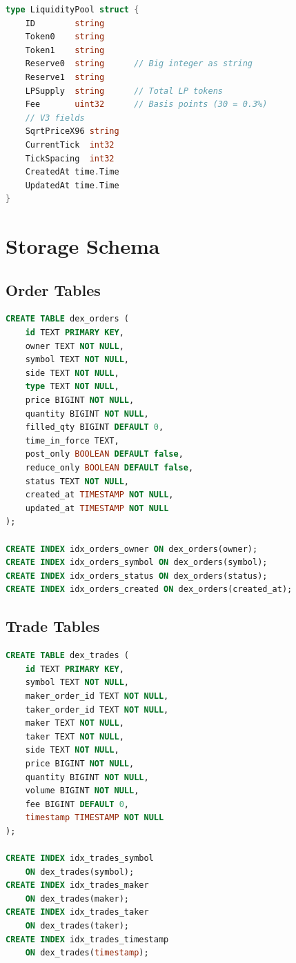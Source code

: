 \documentclass[11pt,twocolumn]{article}
\begin{document}
\begin{lstlisting}[language=Go,caption={Liquidity pool representation}]
type LiquidityPool struct {
    ID        string
    Token0    string
    Token1    string
    Reserve0  string      // Big integer as string
    Reserve1  string
    LPSupply  string      // Total LP tokens
    Fee       uint32      // Basis points (30 = 0.3%)
    // V3 fields
    SqrtPriceX96 string
    CurrentTick  int32
    TickSpacing  int32
    CreatedAt time.Time
    UpdatedAt time.Time
}
\end{lstlisting}

\section{Storage Schema}

\subsection{Order Tables}

\begin{lstlisting}[language=SQL,caption={Order storage schema}]
CREATE TABLE dex_orders (
    id TEXT PRIMARY KEY,
    owner TEXT NOT NULL,
    symbol TEXT NOT NULL,
    side TEXT NOT NULL,
    type TEXT NOT NULL,
    price BIGINT NOT NULL,
    quantity BIGINT NOT NULL,
    filled_qty BIGINT DEFAULT 0,
    time_in_force TEXT,
    post_only BOOLEAN DEFAULT false,
    reduce_only BOOLEAN DEFAULT false,
    status TEXT NOT NULL,
    created_at TIMESTAMP NOT NULL,
    updated_at TIMESTAMP NOT NULL
);

CREATE INDEX idx_orders_owner ON dex_orders(owner);
CREATE INDEX idx_orders_symbol ON dex_orders(symbol);
CREATE INDEX idx_orders_status ON dex_orders(status);
CREATE INDEX idx_orders_created ON dex_orders(created_at);
\end{lstlisting}

\subsection{Trade Tables}

\begin{lstlisting}[language=SQL,caption={Trade storage schema}]
CREATE TABLE dex_trades (
    id TEXT PRIMARY KEY,
    symbol TEXT NOT NULL,
    maker_order_id TEXT NOT NULL,
    taker_order_id TEXT NOT NULL,
    maker TEXT NOT NULL,
    taker TEXT NOT NULL,
    side TEXT NOT NULL,
    price BIGINT NOT NULL,
    quantity BIGINT NOT NULL,
    volume BIGINT NOT NULL,
    fee BIGINT DEFAULT 0,
    timestamp TIMESTAMP NOT NULL
);

CREATE INDEX idx_trades_symbol
    ON dex_trades(symbol);
CREATE INDEX idx_trades_maker
    ON dex_trades(maker);
CREATE INDEX idx_trades_taker
    ON dex_trades(taker);
CREATE INDEX idx_trades_timestamp
    ON dex_trades(timestamp);
\end{lstlisting}
\end{document}

